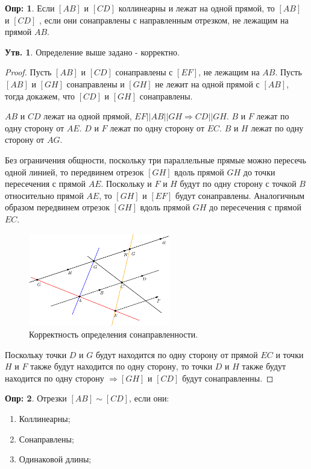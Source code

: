 \documentclass[12pt]{article}
\theoremstyle{definition}
\newtheorem{defn}{Опр:}
\newtheorem{prop}{Утв.}
\begin{document}
\begin{defn}
	Если $[AB]$ и $[CD]$ коллинеарны и лежат на одной прямой, то $[AB]$ и $[CD]$ , если они сонаправлены с направленным отрезком, не лежащим на прямой $AB$.
\end{defn}
\begin{prop}
	Определение выше задано - корректно.
\end{prop}
\begin{proof}
	Пусть $[AB]$ и $[CD]$ сонаправлены с $[EF]$, не лежащим на $AB$. Пусть $[AB]$ и $[GH]$ сонаправлены и $[GH]$ не лежит на одной прямой с $[AB]$, тогда докажем, что $[CD]$ и $[GH]$ сонаправлены. 
	
	$AB$ и $CD$ лежат на одной прямой, $EF ||AB ||GH \Rightarrow CD || GH$. $B$ и $F$ лежат по одну сторону от $AE$. $D$ и $F$ лежат по одну сторону от $EC$. $B$ и $H$ лежат по одну сторону от $AG$. 
	
	Без ограничения общности, поскольку три параллельные прямые можно пересечь одной линией, то передвинем отрезок $[GH]$ вдоль прямой $GH$ до точки пересечения с прямой $AE$. Поскольку и $F$ и $H$ будут по одну сторону с точкой $B$ относительно прямой $AE$, то $[GH]$ и $[EF]$ будут сонаправлены. Аналогичным образом передвинем отрезок $[GH]$ вдоль прямой $GH$ до пересечения с прямой $EC$. 
	\begin{figure}[H]
		\centering
		\includegraphics[width=0.55\textwidth]{ANGL4_3.eps}
		\caption{Корректность определения сонаправленности.}
		\label{4_3}
	\end{figure}
	Поскольку точки $D$ и $G$ будут находится по одну сторону от прямой $EC$ и точки $H$ и $F$ также будут находится по одну сторону, то точки $D$ и $H$ также будут находится по одну сторону $\Rightarrow [GH]$ и $[CD]$ будут сонаправленны.
\end{proof}
\begin{defn}
	Отрезки $[AB]\sim [CD]$, если они:
	\begin{enumerate}[label=\arabic*)]
		\item Коллинеарны;
		\item Сонаправлены;
		\item Одинаковой длины;
	\end{enumerate}
\end{defn}
\end{document}

